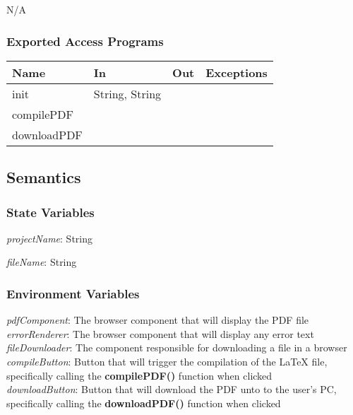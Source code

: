 \documentclass[12pt, titlepage]{article}
\begin{document}
	N/A
	
	\subsubsection{Exported Access Programs}
	
	\begin{center}
		\begin{tabular}{l l l l}
			\hline
			\textbf{Name} & \textbf{In} & \textbf{Out} & \textbf{Exceptions} \\
			\hline
			init & String, String & & \\
			compilePDF & &  &  \\
			downloadPDF &  &  &  \\
			\hline
		\end{tabular}
	\end{center}
	
	\subsection{Semantics}
	
	\subsubsection{State Variables}
	
	\textit{projectName}: String
	
	\noindent \textit{fileName}: String
	
	\subsubsection{Environment Variables}
	
	\textit{pdfComponent}: The browser component that will display the PDF file\\
	
	\noindent \textit{errorRenderer}: The browser component that will display any error text\\
	
	\noindent \textit{fileDownloader}: The component responsible for downloading a file in a browser\\
	
	\noindent \textit{compileButton}: Button that will trigger the compilation of the LaTeX file, specifically calling the \textbf{compilePDF()} function when clicked\\
	
	\noindent \textit{downloadButton}: Button that will download the PDF unto to the user's PC, specifically calling the \textbf{downloadPDF()} function when clicked
	
\end{document}
